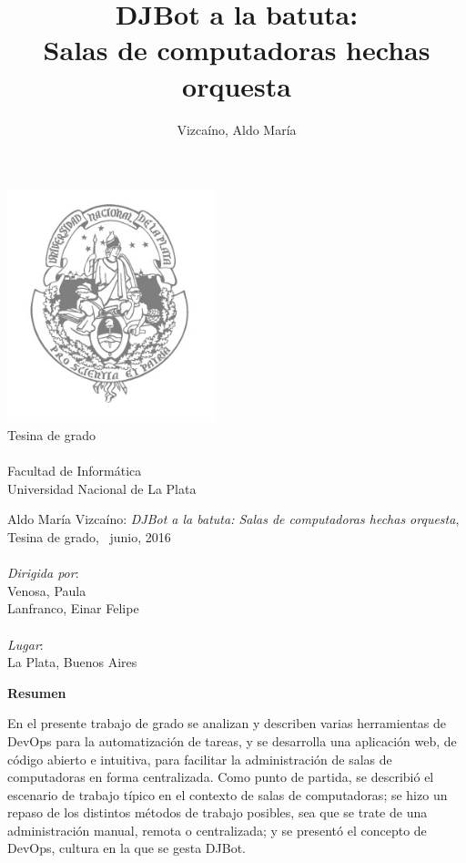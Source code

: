 \documentclass[a4paper,12pt]{article}
\author{Vizcaíno, Aldo María}
\date{}
\title{\textbf{DJBot a la batuta:\\\medskip
\large Salas de computadoras hechas orquesta}}
\begin{document}
\clearpage\maketitle
\begin{center}
  \includegraphics[width=6cm]{img/unlp} \\ \medskip %
  Tesina de grado\\
  \\
Facultad de Informática\\
Universidad Nacional de La Plata
\end{center}
\thispagestyle{empty}

\newpage
\thispagestyle{empty}
\hfill
\vfill
\noindent Aldo María Vizcaíno: \textit{DJBot a la batuta: Salas de computadoras hechas orquesta}, Tesina de grado, 
\textcopyright\ junio, 2016 \\
\\
\noindent\textit{Dirigida por}: \\
Venosa, Paula \\
Lanfranco, Einar Felipe \\ 
\\
\noindent\textit{Lugar}:\\
La Plata, Buenos Aires
\medskip

\newpage

\thispagestyle{empty}

{\Large\textbf{Resumen}\\}

En el presente trabajo de grado se analizan y describen varias herramientas de DevOps para la 
automatización de tareas, y se desarrolla una aplicación web, de código abierto e intuitiva, para 
facilitar la administración de salas de computadoras en forma centralizada. Como punto de partida,
se describió el escenario de trabajo típico en el contexto de salas de computadoras; se hizo un
repaso de los distintos métodos de trabajo posibles, sea que se trate de una administración
manual, remota o centralizada; y se presentó el concepto de DevOps, cultura en la que se gesta
DJBot.\\
\end{document}
